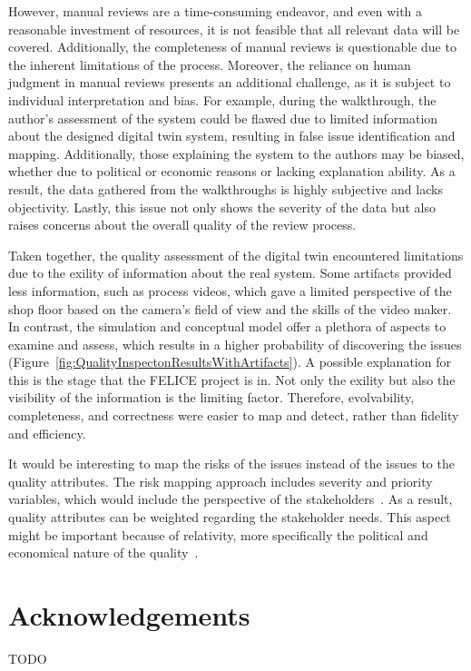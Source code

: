 \documentclass{llncs}
\begin{document}
    However, manual reviews are a time-consuming endeavor, and even with a reasonable investment of resources, it is not feasible that all relevant data will be covered. 
    Additionally, the completeness of manual reviews is questionable due to the inherent limitations of the process. 
    Moreover, the reliance on human judgment in manual reviews presents an additional challenge, as it is subject to individual interpretation and bias.  
    For example, during the walkthrough, the author's assessment of the system could be flawed due to limited information about the designed digital twin system, resulting in false 
    issue identification and mapping. Additionally, those explaining the system to the authors may be biased, 
    whether due to political or economic reasons or lacking explanation ability. As a result, the data gathered from the walkthroughs is highly subjective and lacks objectivity. Lastly, this issue not only shows the severity of the data but also raises concerns about 
    the overall quality of the review process.

    Taken together, the quality assessment of the digital twin encountered limitations due to the exility of information about the real system. 
    Some artifacts provided less information, such as process videos, which gave a limited perspective of the shop floor based on the camera's 
    field of view and the skills of the video maker. In contrast, the simulation and conceptual model offer a plethora of aspects to examine and assess, 
    which results in a higher probability of discovering the issues (Figure~\ref{fig:QualityInspectonResultsWithArtifacts}). 
    A possible explanation for this is the stage that the FELICE project is in. Not only the exility but also the visibility of the information is the limiting factor. 
    Therefore, evolvability, completeness, and correctness were easier to map and detect, rather than fidelity and efficiency. 

    It would be interesting to map the risks of the issues instead of the issues to the quality attributes. 
    The risk mapping approach includes severity and priority variables, which would include the perspective of the stakeholders~\cite{CemKanerSoftwareTesting, ISO/IEC/IEEE29119}.
    As a result, quality attributes can be weighted regarding the stakeholder needs.  This aspect might be important because of relativity, 
    more specifically the political and economical nature of the quality~\cite{SystemQuality}. 

   
    \section*{Acknowledgements}
    TODO

    
    
\end{document}

